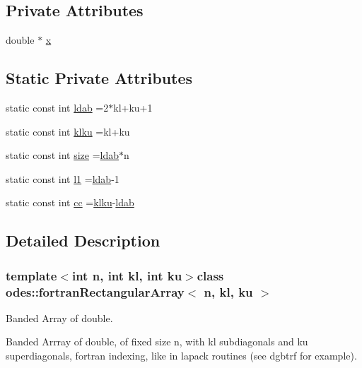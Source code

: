 \subsection*{Private Attributes}
\begin{DoxyCompactItemize}
\item 
double $\ast$ \hyperlink{classodes_1_1fortranRectangularArray_a718a298ef74cd3ba533fc73ad739acc9}{x}
\end{DoxyCompactItemize}
\subsection*{Static Private Attributes}
\begin{DoxyCompactItemize}
\item 
static const int \hyperlink{classodes_1_1fortranRectangularArray_a71e7e0def95610ca1a1bc4c00e65b3cf}{ldab} =2$\ast$kl+ku+1
\item 
static const int \hyperlink{classodes_1_1fortranRectangularArray_afdc8eca52742d938bbe7670769c33818}{klku} =kl+ku
\item 
static const int \hyperlink{classodes_1_1fortranRectangularArray_a4827111315c99a9e0e80e98767fe21e3}{size} =\hyperlink{classodes_1_1fortranRectangularArray_a71e7e0def95610ca1a1bc4c00e65b3cf}{ldab}$\ast$n
\item 
static const int \hyperlink{classodes_1_1fortranRectangularArray_ad1d9e54651da99373857744ddfae77a6}{l1} =\hyperlink{classodes_1_1fortranRectangularArray_a71e7e0def95610ca1a1bc4c00e65b3cf}{ldab}-\/1
\item 
static const int \hyperlink{classodes_1_1fortranRectangularArray_a7a59fad036a553bc9f65842637465cad}{cc} =\hyperlink{classodes_1_1fortranRectangularArray_afdc8eca52742d938bbe7670769c33818}{klku}-\/\hyperlink{classodes_1_1fortranRectangularArray_a71e7e0def95610ca1a1bc4c00e65b3cf}{ldab}
\end{DoxyCompactItemize}


\subsection{Detailed Description}
\subsubsection*{template$<$int n, int kl, int ku$>$class odes\+::fortran\+Rectangular\+Array$<$ n, kl, ku $>$}

Banded Array of double. 

Banded Arrray of double, of fixed size n, with kl subdiagonals and ku superdiagonals, fortran indexing, like in lapack routines (see dgbtrf for example). 

